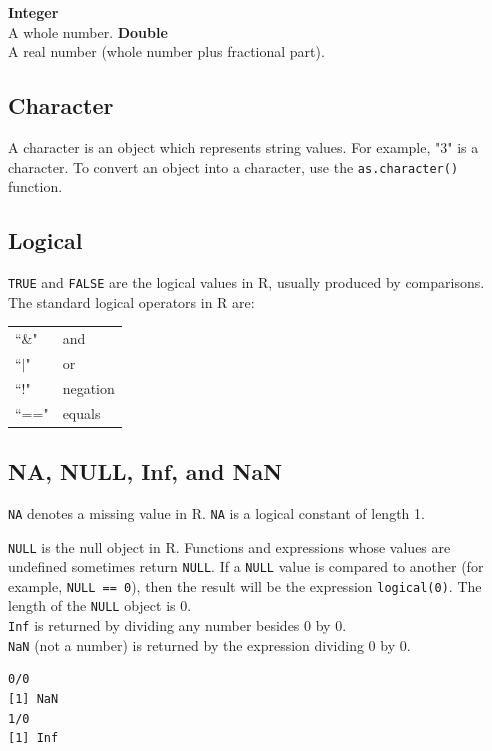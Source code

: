 \documentclass[11pt,letterpaper,fleqn]{report}
\begin{document}
\textbf{Integer}\\
A whole number. 
\newline \textbf{Double}\\
A real number (whole number plus fractional part).

\subsection{Character}
A character is an object which represents string values. For example, "3" is a character. To convert an object into a character, use the \texttt{as.character()} function. 

\subsection{Logical}
\texttt{TRUE} and \texttt{FALSE} are the logical values in R, usually produced by comparisons. The standard logical operators in R are: 
\begin{tabular}{ll}
``\&"  & and \\
``$\mid$" & or \\
``!" & negation\\
``==" & equals
\end{tabular}

\subsection{NA, NULL, Inf, and NaN}
\texttt{NA} denotes a missing value in R. \texttt{NA} is a logical constant of length 1.

\texttt{NULL} is the null object in R. Functions and expressions whose values are undefined sometimes return \texttt{NULL}. If a \texttt{NULL} value is compared to another (for example, \texttt{NULL == 0}), then the result will be the expression \texttt{logical(0)}. The length of the \texttt{NULL} object is 0.\\
\texttt{Inf} is returned by dividing any number besides 0 by 0.\\
\texttt{NaN} (not a number) is returned by the expression dividing 0 by 0.

\begin{verbatim}
0/0
[1] NaN
1/0
[1] Inf
\end{verbatim}
\end{document}
